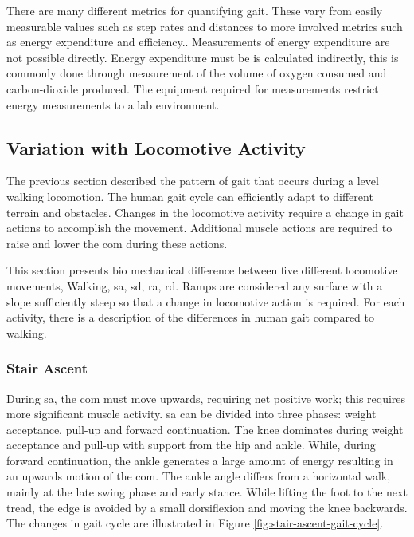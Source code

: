 There are many different metrics for quantifying gait. These vary from easily measurable values such as step rates and distances to more involved metrics such as energy expenditure and efficiency.\cite{Ramakrishnan2019, Coutts1999}. Measurements of energy expenditure are not possible directly. Energy expenditure must be is calculated indirectly, this is commonly done through measurement of the volume of oxygen consumed and carbon-dioxide produced. The equipment required for measurements restrict energy measurements to a lab environment.\cite{Waters1999}

\subsection{Variation with Locomotive Activity}
The previous section described the pattern of gait that occurs during a level walking locomotion. The human gait cycle can efficiently adapt to different terrain and obstacles. Changes in the locomotive activity require a change in gait actions to accomplish the movement\cite{Hargrove2015}. Additional muscle actions are required to raise and lower the \acrshort{com} during these actions\cite{Franz2012a}.

This section presents bio mechanical difference between five different locomotive movements, Walking, \acrfull{sa}, \acrfull{sd}, \acrfull{ra}, \acrfull{rd}. Ramps are considered any surface with a slope sufficiently steep so that a change in locomotive action is required. For each activity, there is a description of the differences in human gait compared to walking.

\subsubsection{Stair Ascent}
During \acrshort{sa}, the \acrshort{com} must move upwards, requiring net positive work; this requires more significant muscle activity. \acrshort{sa} can be divided into three phases: weight acceptance, pull-up and forward continuation. The knee dominates during weight acceptance and pull-up with support from the hip and ankle. While, during forward continuation, the ankle generates a large amount of energy resulting in an upwards motion of the \acrshort{com}. The ankle angle differs from a horizontal walk, mainly at the late swing phase and early stance. While lifting the foot to the next tread, the edge is avoided by a small dorsiflexion and moving the knee backwards.\cite{Svensson2007} The changes in gait cycle are illustrated in Figure \ref{fig:stair-ascent-gait-cycle}.

